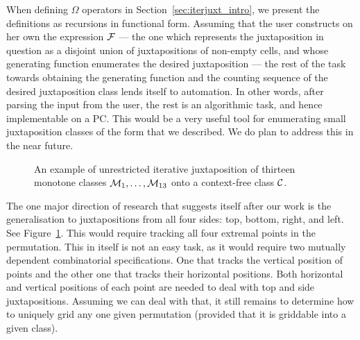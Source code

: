 \documentclass[12pt, a4paper, twoside]{report}
\begin{document}
When defining $\Omega$ operators in Section~\ref{sec:iterjuxt_intro}, we present the definitions as recursions in functional form. Assuming that the user constructs on her own the expression $\mathcal{F}$ --- the one which represents the juxtaposition in question as a disjoint union of juxtapositions of non-empty cells, and whose generating function enumerates the desired juxtaposition --- the rest of the task towards obtaining the generating function and the counting sequence of the desired juxtaposition class lends itself to automation. In other words, after parsing the input from the user, the rest is an algorithmic task, and hence implementable on a PC. This would be a very useful tool for enumerating small juxtaposition classes of the form that we described. We do plan to address this in the near future.

\begin{figure}[ht!]
  \begin{center}
    \caption{An example of unrestricted iterative juxtaposition of thirteen monotone classes $\mathcal{M}_1,\ldots,\mathcal{M}_{13}$ onto a context-free class $\mathcal{C}$.}
    \label{fig:juxtopia}
  \end{center}
\end{figure}


The one major direction of research that suggests itself after our work is the generalisation to juxtapositions from all four sides: top, bottom, right, and left. See Figure~\ref{fig:juxtopia}. This would require tracking all four extremal points in the permutation. This in itself is not an easy task, as it would require two mutually dependent combinatorial specifications. One that tracks the vertical position of points and the other one that tracks their horizontal positions. Both horizontal and vertical positions of each point are needed to deal with top and side juxtapositions. Assuming we can deal with that, it still remains to determine how to uniquely grid any one given permutation (provided that it is griddable into a given class).
\end{document}

